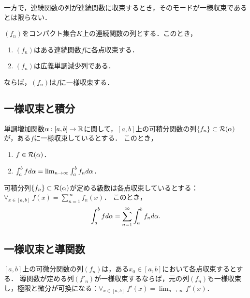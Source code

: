 \documentclass[uplatex, dvipdfmx]{jsreport}
\begin{document}
\begin{tcolorbox}[colframe=ForestGreen, colback=ForestGreen!10!white,breakable,colbacktitle=ForestGreen!40!white,coltitle=black,fonttitle=\bfseries\sffamily,
title=]
    一方で，連続関数の列が連続関数に収束するとき，そのモードが一様収束であるとは限らない．
\end{tcolorbox}

\begin{theorem}
    $(f_n)$をコンパクト集合$K$上の連続関数の列とする．このとき，
    \begin{enumerate}
        \item $(f_n)$はある連続関数$f$に各点収束する．
        \item $(f_n)$は広義単調減少列である．
    \end{enumerate}
    ならば，$(f_n)$は$f$に一様収束する．
\end{theorem}

\subsection{一様収束と積分}

\begin{theorem}
    単調増加関数$\alpha:[a,b]\to\mathbb{R}$に関して，$[a,b]$上の可積分関数の列$\{f_n\}\subset\mathcal{R}(\alpha)$が，ある$f$に一様収束しているとする．
    このとき，
    \begin{enumerate}
        \item $f\in\mathcal{R}(\alpha)$．
        \item $\int^b_afd\alpha=\lim_{n\to\infty}\int^b_af_nd\alpha$．
    \end{enumerate}
\end{theorem}

\begin{corollary}[項別積分]
    可積分列$\{f_n\}\subset\mathcal{R}(\alpha)$が定める級数は各点収束しているとする：$\forall_{x\in[a,b]}\;f(x)=\sum^\infty_{n=1}f_n(x)$．
    このとき，
    \[\int^b_afd\alpha=\sum^\infty_{n=1}\int^b_af_nd\alpha.\]
\end{corollary}

\subsection{一様収束と導関数}

\begin{theorem}
    $[a,b]$上の可微分関数の列$(f_n)$は，ある$x_0\in[a,b]$において各点収束するとする．
    導関数が定める列$(f'_n)$が一様収束するならば，元の列$(f_n)$も一様収束し，極限と微分が可換になる：$\forall_{x\in[a,b]}\;f'(x)=\lim_{n\to\infty}f'(x)$．
\end{theorem}
\end{document}
